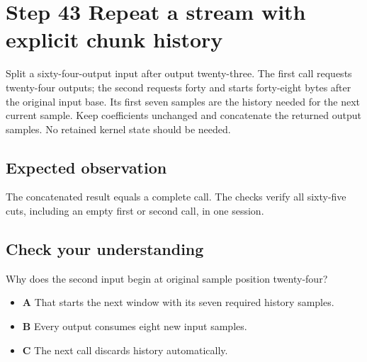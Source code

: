 \section{Step 43 Repeat a stream with explicit chunk history}\label{fir-s43}

Split a sixty-four-output input after output twenty-three. The first call requests twenty-four outputs; the second requests forty and starts forty-eight bytes after the original input base. Its first seven samples are the history needed for the next current sample. Keep coefficients unchanged and concatenate the returned output samples. No retained kernel state should be needed.

\subsection{Expected observation}
The concatenated result equals a complete call. The checks verify all sixty-five cuts, including an empty first or second call, in one session.

\subsection{Check your understanding}
Why does the second input begin at original sample position twenty-four?

\begin{itemize}
\item \textbf{A} That starts the next window with its seven required history samples.
\item \textbf{B} Every output consumes eight new input samples.
\item \textbf{C} The next call discards history automatically.
\end{itemize}

